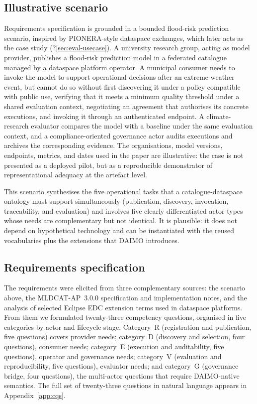 \documentclass[Afour,sagev,times]{sagej}
\begin{document}
\subsection{Illustrative scenario}\label{sec:scenario}

Requirements specification is grounded in a bounded flood-risk prediction scenario, inspired by PIONERA-style dataspace exchanges, which later acts as the case study (?\ref{sec:eval-usecase}). A university research group, acting as model provider, publishes a flood-risk prediction model in a federated catalogue managed by a dataspace platform operator. A municipal consumer needs to invoke the model to support operational decisions after an extreme-weather event, but cannot do so without first discovering it under a policy compatible with public use, verifying that it meets a minimum quality threshold under a shared evaluation context, negotiating an agreement that authorises its concrete executions, and invoking it through an authenticated endpoint. A climate-research evaluator compares the model with a baseline under the same evaluation context, and a compliance-oriented governance actor audits executions and archives the corresponding evidence. The organisations, model versions, endpoints, metrics, and dates used in the paper are illustrative: the case is not presented as a deployed pilot, but as a reproducible demonstrator of representational adequacy at the artefact level.

This scenario synthesises the five operational tasks that a catalogue-dataspace ontology must support simultaneously (publication, discovery, invocation, traceability, and evaluation) and involves five clearly differentiated actor types whose needs are complementary but not identical. It is plausible: it does not depend on hypothetical technology and can be instantiated with the reused vocabularies plus the extensions that DAIMO introduces.

\subsection{Requirements specification}\label{sec:method-req}

The requirements were elicited from three complementary sources: the scenario above, the MLDCAT-AP~3.0.0 specification and implementation notes, and the analysis of selected Eclipse EDC extension terms used in dataspace platforms. From them we formulated twenty-three competency questions, organised in five categories by actor and lifecycle stage. Category~R (registration and publication, five questions) covers provider needs; category~D (discovery and selection, four questions), consumer needs; category~E (execution and auditability, five questions), operator and governance needs; category~V (evaluation and reproducibility, five questions), evaluator needs; and category~G (governance bridge, four questions), the multi-actor questions that require DAIMO-native semantics. The full set of twenty-three questions in natural language appears in Appendix~\ref{app:cqs}.
\end{document}
